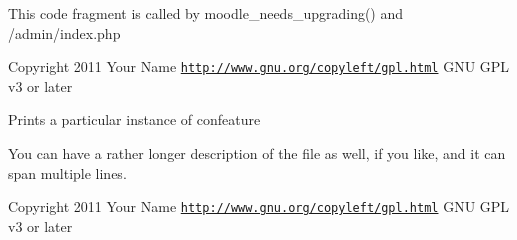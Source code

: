 This code fragment is called by moodle\-\_\-needs\-\_\-upgrading() and /admin/index.php

\begin{DoxyCopyright}{Copyright}
2011 Your Name  \href{http://www.gnu.org/copyleft/gpl.html}{\tt http\-://www.\-gnu.\-org/copyleft/gpl.\-html} G\-N\-U G\-P\-L v3 or later
\end{DoxyCopyright}
Prints a particular instance of confeature

You can have a rather longer description of the file as well, if you like, and it can span multiple lines.

\begin{DoxyCopyright}{Copyright}
2011 Your Name  \href{http://www.gnu.org/copyleft/gpl.html}{\tt http\-://www.\-gnu.\-org/copyleft/gpl.\-html} G\-N\-U G\-P\-L v3 or later 
\end{DoxyCopyright}
